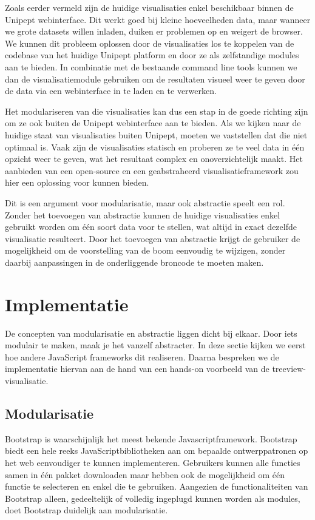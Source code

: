 Zoals eerder vermeld zijn de huidige visualisaties enkel beschikbaar binnen de
Unipept webinterface. Dit werkt goed bij kleine hoeveelheden data, maar wanneer
we grote datasets willen inladen, duiken er problemen op en weigert de browser.
We kunnen dit probleem oplossen door de visualisaties los te koppelen van de
codebase van het huidige Unipept platform en door ze als zelfstandige modules
aan te bieden. In combinatie met de bestaande command line tools kunnen we dan
de visualisatiemodule gebruiken om de resultaten visueel weer te
geven door de data via een webinterface in te laden en te verwerken.

Het modulariseren van die visualisaties kan dus een stap in de goede richting
zijn om ze ook buiten de Unipept webinterface aan te bieden. Als we kijken naar
de huidige staat van visualisaties buiten Unipept, moeten we vaststellen dat die
niet optimaal is. Vaak zijn de visualisaties statisch en proberen ze te veel
data in één opzicht weer te geven, wat het resultaat complex en onoverzichtelijk
maakt. Het aanbieden van een open-source en een geabstraheerd
visualisatieframework zou hier een oplossing voor kunnen bieden.

Dit is een argument voor modularisatie, maar ook abstractie speelt een rol.
Zonder het toevoegen van abstractie kunnen de huidige visualisaties enkel
gebruikt worden om één soort data voor te stellen, wat altijd in exact dezelfde
visualisatie resulteert. Door het toevoegen van abstractie krijgt de gebruiker
de mogelijkheid om de voorstelling van de boom eenvoudig te wijzigen, zonder
daarbij aanpassingen in de onderliggende broncode te moeten maken.

\section{Implementatie}

De concepten van modularisatie en abstractie liggen dicht
bij elkaar. Door iets modulair te maken, maak je het vanzelf abstracter. In 
deze sectie kijken we eerst hoe andere JavaScript frameworks dit
realiseren. Daarna bespreken we de implementatie hiervan aan de
hand van een hands-on voorbeeld van de treeview-visualisatie.

\subsection{Modularisatie}
Bootstrap\cite{Boots1:online} is waarschijnlijk het meest bekende
Javascriptframework. Bootstrap biedt een hele reeks JavaScriptbibliotheken aan
om bepaalde ontwerppatronen op het web eenvoudiger te kunnen implementeren.
Gebruikers kunnen alle functies samen in één pakket downloaden maar hebben ook
de mogelijkheid om één functie te selecteren en enkel die te gebruiken.
Aangezien de functionaliteiten van Bootstrap alleen, gedeeltelijk of volledig
ingeplugd kunnen worden als modules, doet Bootstrap duidelijk aan modularisatie.

